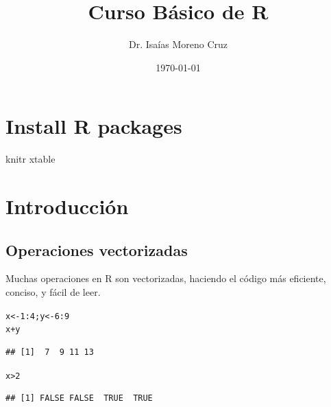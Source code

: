 \documentclass[spanish, letterpaper,12]{article}\usepackage[]{graphicx}\usepackage[]{xcolor}
\title{Curso Básico de R}
\author{Dr. Isaías Moreno Cruz}
\date{\today}
\makeatletter
\newcommand{\hlnum}[1]{\textcolor[rgb]{0.686,0.059,0.569}{#1}}%
\newcommand{\hlopt}[1]{\textcolor[rgb]{0,0,0}{#1}}%
\newcommand{\hldef}[1]{\textcolor[rgb]{0.345,0.345,0.345}{#1}}%
\newcommand{\hlkwb}[1]{\textcolor[rgb]{0.69,0.353,0.396}{#1}}%
\newenvironment{kframe}{%
 \def\at@end@of@kframe{}%
 \ifinner\ifhmode%
  \def\at@end@of@kframe{\end{minipage}}%
  \begin{minipage}{\columnwidth}%
 \fi\fi%
 \def\FrameCommand##1{\hskip\@totalleftmargin \hskip-\fboxsep
 \colorbox{shadecolor}{##1}\hskip-\fboxsep
     \hskip-\linewidth \hskip-\@totalleftmargin \hskip\columnwidth}%
 \MakeFramed {\advance\hsize-\width
   \@totalleftmargin\z@ \linewidth\hsize
   \@setminipage}}%
 {\par\unskip\endMakeFramed%
 \at@end@of@kframe}
\newenvironment{knitrout}{}{} %
\makeatother
\begin{document}
                                                      
\renewcommand{\tablename}{Tabla}

\maketitle

\section{Install R packages}


knitr
xtable


\section{Introducción}
\label{sec:intro}


\subsection{Operaciones vectorizadas}
\label{subsec:operaciones_vectorizadas}

Muchas operaciones en R son vectorizadas, haciendo el código más eficiente, conciso, y fácil de leer.

\begin{knitrout}
\color{fgcolor}\begin{kframe}
\begin{alltt}
\hldef{x} \hlkwb{<-} \hlnum{1}\hlopt{:}\hlnum{4}\hldef{; y} \hlkwb{<-} \hlnum{6}\hlopt{:}\hlnum{9}
\hldef{x}\hlopt{+}\hldef{y}
\end{alltt}
\begin{verbatim}
## [1]  7  9 11 13
\end{verbatim}
\end{kframe}
\end{knitrout}


\begin{knitrout}
\color{fgcolor}\begin{kframe}
\begin{alltt}
\hldef{x} \hlopt{>} \hlnum{2}
\end{alltt}
\begin{verbatim}
## [1] FALSE FALSE  TRUE  TRUE
\end{verbatim}
\end{kframe}
\end{knitrout}
\end{document}
